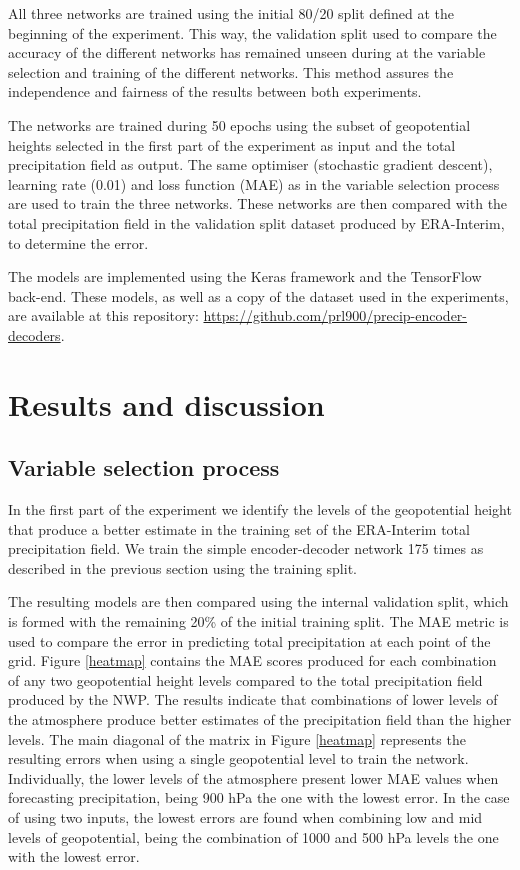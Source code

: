\documentclass[twocol]{ametsoc}
\begin{document}
All three networks are trained using the initial 80/20 split defined at the beginning of the experiment. This way, the validation split used to compare the accuracy of the different networks has remained unseen during at the variable selection and training of the different networks. This method assures the independence and fairness of the results between both experiments. 

The networks are trained during 50 epochs using the subset of geopotential heights selected in the first part of the experiment as input and the total precipitation field as output. The same optimiser (stochastic gradient descent), learning rate (0.01) and loss function (MAE) as in the variable selection process are used to train the three networks. These networks are then compared with the total precipitation field in the validation split dataset produced by ERA-Interim, to determine the error.

The models are implemented using the Keras \citep{chollet2017keras} framework and the TensorFlow \citep{abadi2016tensorflow} back-end. These models, as well as a copy of the dataset used in the experiments, are available at this repository: \url{https://github.com/prl900/precip-encoder-decoders}.

\section{Results and discussion}

\subsection{Variable selection process}

In the first part of the experiment we identify the levels of the geopotential height that produce a better estimate in the training set of the ERA-Interim total precipitation field. We train the simple encoder-decoder network 175 times as described in the previous section using the training split. 

The resulting models are then compared using the internal validation split, which is formed with the remaining 20\% of the initial training split. The MAE metric is used to compare the error in predicting total precipitation at each point of the grid. Figure \ref{heatmap} contains the MAE scores produced for each combination of any two geopotential height levels compared to the total precipitation field produced by the NWP. The results indicate that combinations of lower levels of the atmosphere produce better estimates of the precipitation field than the higher levels. The main diagonal of the matrix in Figure \ref{heatmap} represents the resulting errors when using a single geopotential level to train the network. Individually, the lower levels of the atmosphere present lower MAE values when forecasting precipitation, being 900 hPa the one with the lowest error. In the case of using two inputs, the lowest errors are found when combining low and mid levels of geopotential, being the combination of 1000 and 500 hPa levels the one with the lowest error.
\end{document}
